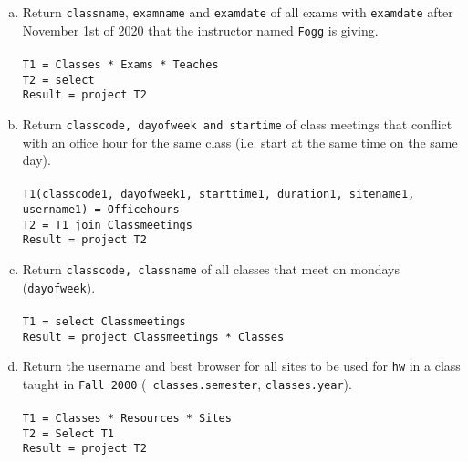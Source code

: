 \documentclass[11pt]{article}
\begin{document}
\begin{enumerate}  [(a)]
\item Return {\tt classname}, {\tt examname} and {\tt examdate} of
  all exams with {\tt examdate} after November 1st of 2020 that the
  instructor named {\tt Fogg} is giving. \\\\
 \texttt{T1 = Classes * Exams * Teaches} \\
 \texttt{T2 = select} \\
 \texttt{Result = project T2}

\item Return {\tt classcode, dayofweek and startime} of class meetings
  that conflict with an office hour for the same class (i.e. start at
  the same time on the same day). \\\\
 \texttt{T1(classcode1, dayofweek1, starttime1, duration1, sitename1, username1) = Officehours} \\
 \texttt{T2 = T1 join Classmeetings} \\
 \texttt{Result = project T2}

\item Return {\tt classcode, classname} of all classes that meet on
  mondays ({\tt dayofweek}). \\\\
 \texttt{T1 = select Classmeetings} \\
 \texttt{Result = project Classmeetings * Classes}

\item Return the username and best browser for all sites to be used
  for {\tt hw} in a class taught in {\tt Fall 2000} ({\tt
    classes.semester}, {\tt classes.year}). \\\\
\texttt{T1 = Classes * Resources * Sites} \\
\texttt{T2 = Select T1} \\
\texttt{Result = project T2}


\end{enumerate}
\end{document}
